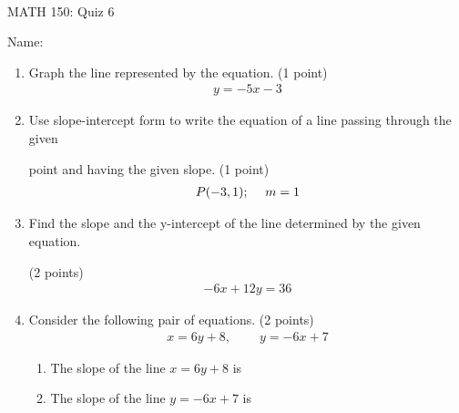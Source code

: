 \documentclass[11pt]{article}
\newcommand{\vs}{\vspace{0.2in}}
\begin{document}
\tt
\centerline{MATH 150: Quiz 6}
\vs

Name: \underline{\hspace{5cm}}

\medskip

\begin{enumerate}
\item
Graph the line represented by the equation. 
(1 point)
\begin{align*}    
y = -5x - 3
\end{align*}
\vspace{3in}

\item
Use slope-intercept form to write the equation of a line passing through the given 

point and having the given slope. 
(1 point)
\begin{align*}
    P(-3, 1)\text{;}\hspace{0.5cm} m = 1
\end{align*}

\newpage

\item
Find the slope and the y-intercept of the line determined by the given equation. 

(2 points)
\begin{align*}
-6x + 12y = 36
\end{align*}

\vspace{3in}

\item
Consider the following pair of equations. 
(2 points)
\begin{align*}
    x = 6y + 8
    \text{,} \hspace{1cm}
    y = -6x + 7
\end{align*}
\vs

\begin{enumerate}
    \item 
    The slope of the line $x = 6y + 8$ is
    \underline{\hspace{3cm}}
    \vs
    
    \item 
    The slope of the line $y = -6x + 7$ is
    \underline{\hspace{3cm}}
    \vs


\end{enumerate}
\end{enumerate}
\end{document}
